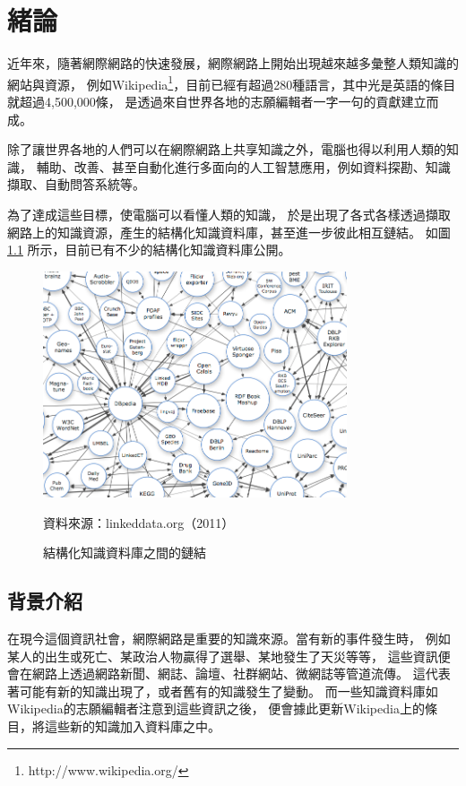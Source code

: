 %
%
%
\chapter{緒論}
\label{c:intro}

近年來，隨著網際網路的快速發展，網際網路上開始出現越來越多彙整人類知識的網站與資源，
例如Wikipedia\footnote{http://www.wikipedia.org/}，目前已經有超過280種語言，其中光是英語的條目就超過4,500,000條，
是透過來自世界各地的志願編輯者一字一句的貢獻建立而成。

除了讓世界各地的人們可以在網際網路上共享知識之外，電腦也得以利用人類的知識，
輔助、改善、甚至自動化進行多面向的人工智慧應用，例如資料探勘、知識擷取、自動問答系統等。

為了達成這些目標，使電腦可以看懂人類的知識，
於是出現了各式各樣透過擷取網路上的知識資源，產生的結構化知識資料庫，甚至進一步彼此相互鏈結。
如圖\ref{i:lod} 所示，目前已有不少的結構化知識資料庫公開。

\begin{figure}[h]
    \centering
    \includegraphics[width=0.8\textwidth]{images/01-lod-datasets}
    \caption{結構化知識資料庫之間的鏈結}
    \label{i:lod}
    資料來源：linkeddata.org（2011）
\end{figure}

%
%
\section{背景介紹}
在現今這個資訊社會，網際網路是重要的知識來源。當有新的事件發生時，
例如某人的出生或死亡、某政治人物贏得了選舉、某地發生了天災等等，
這些資訊便會在網路上透過網路新聞、網誌、論壇、社群網站、微網誌等管道流傳。
這代表著可能有新的知識出現了，或者舊有的知識發生了變動。
而一些知識資料庫如Wikipedia的志願編輯者注意到這些資訊之後，
便會據此更新Wikipedia上的條目，將這些新的知識加入資料庫之中。

